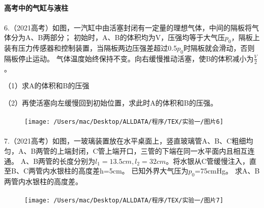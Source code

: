 \documentclass[UTF8]{ctexart}
\begin{document}
\paragraph{}
\paragraph{}
\paragraph{}
\paragraph{}

\paragraph{高考中的气缸与液柱}

\paragraph{}
    6.（2021高考）如图，一汽缸中由活塞封闭有一定量的理想气体，中间的隔板将气体分为A、B两部分；
    初始时，A、B的体积均为V，压强均等于大气压$p_{0}$，隔板上装有压力传感器和控制装置，当隔板两边压强差超过0.5$p_{0}$时隔板就会滑动，否则隔板停止运动。
    气体温度始终保持不变。向右缓慢推动活塞，使B的体积减小为$\frac{V}{2}$。

    （1）求A的体积和B的压强

    （2）再使活塞向左缓慢回到初始位置，求此时A的体积和B的压强。

\begin{figure}[htbp]
\paragraph{} \texttt{[image: /Users/mac/Desktop/ALLDATA/程序/TEX/实验一/图片6]}\label{fig:figure3}
\end{figure}

\paragraph{}

\paragraph{}
    7.（2021高考）如图，一玻璃装置放在水平桌面上，竖直玻璃管A、B、C粗细均匀，A、B两管的上端封闭，C管上端开口，三管的下端在同一水平面内且相互连通。
    A、B两管的长度分别为$l_{1}=13.5cm,l_{2}=32cm$。将水银从C管缓慢注入，直至B、C两管内水银柱的高度差h=5cm。
    已知外界大气压为$p_{0}$=75cmHg。
    求A、B两管内水银柱的高度差。

\begin{figure}[htbp]
\paragraph{} \texttt{[image: /Users/mac/Desktop/ALLDATA/程序/TEX/实验一/图片7]}\label{fig:figure4}
\end{figure}
\end{document}
